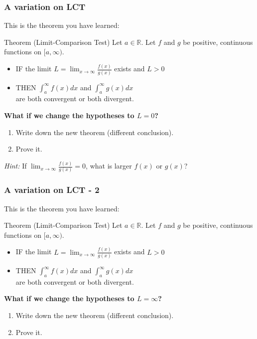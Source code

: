 \documentclass[14pt]{beamer}
\newcommand {\DS} [1] {${\displaystyle #1}$}
\newcommand {\R}{\mathbb{R}}
\newcommand{\p}{\pause}
\newcommand{\setsize}[1]{\fontsize{#1}{#1}\selectfont} %
\newcommand{\smallerfont}{\setsize{13}} %
\begin{document}
\begin{frame}[t]
\setsize{12}
\frametitle{A variation on LCT}

This is the theorem you have learned:
\begin{block}{\smallerfont Theorem (Limit-Comparison Test)}
Let \DS{a \in \R}. 
Let $f$ and $g$ be positive, continuous functions on \DS{[a, \infty)}. 
\begin{itemize}
	\item  IF the limit \;
		\DS{	L = \lim_{x \to \infty} \frac{f(x)}{g(x)} } \; exists and \; \DS{L>0}
	\item  THEN
		\DS{ \int_a^{\infty} \! \! f(x) dx} \; and \; \DS{ \int_a^{\infty} \! \! g(x) dx }
		\\ are both convergent or both divergent.
\end{itemize}
\end{block}

\p \vspace{.2cm}
{\bf What if we change the hypotheses to $L=0$?} 
\begin{enumerate}
	\item  Write down the new theorem (different conclusion).
	\item  Prove it.
\end{enumerate}

\p \vspace{.2cm}
\emph{Hint:}  If \DS{\lim_{x \to \infty} \frac{f(x)}{g(x)}=0 }, what is larger $f(x)$ or $g(x)$?
\end{frame}
\begin{frame}[t]
\setsize{12}
\frametitle{A variation on LCT - 2}

This is the theorem you have learned:
\begin{block}{\smallerfont Theorem (Limit-Comparison Test)}
Let \DS{a \in \R}. 
Let $f$ and $g$ be positive, continuous functions on \DS{[a, \infty)}. 
\begin{itemize}
	\item  IF the limit \;
		\DS{	L = \lim_{x \to \infty} \frac{f(x)}{g(x)} } \; exists and \; \DS{L>0}
	\item  THEN
		\DS{ \int_a^{\infty} \! \! f(x) dx} \; and \; \DS{ \int_a^{\infty} \! \! g(x) dx }
		\\ are both convergent or both divergent.
\end{itemize}
\end{block}

 \vspace{.2cm}
{\bf What if we change the hypotheses to $L=\infty$?} 
\begin{enumerate}
	\item  Write down the new theorem (different conclusion).
	\item  Prove it.
\end{enumerate}

\end{frame}
\end{document}
